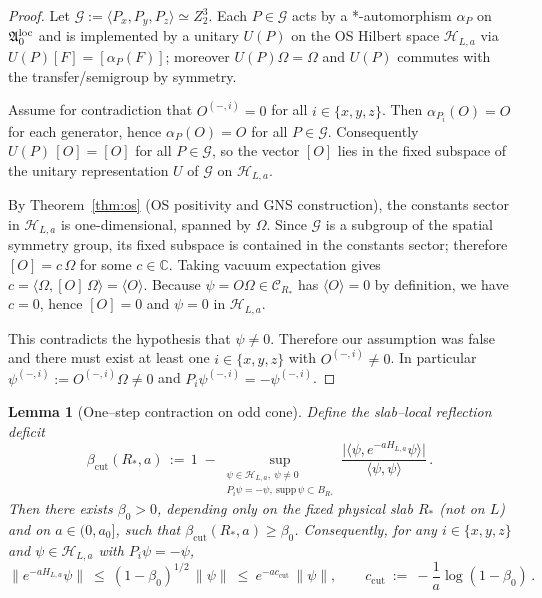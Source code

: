 \documentclass[11pt]{amsart}
\theoremstyle{plain}
\newtheorem{lemma}[theorem]{Lemma}
\theoremstyle{definition}
\theoremstyle{remark}
\begin{document}
\begin{proof}
Let $\mathcal{G}:=\langle P_x,P_y,P_z\rangle\simeq Z_2^3$. Each $P\in\mathcal{G}$ acts by a *-automorphism $\alpha_P$ on $\mathfrak{A}_0^{\rm loc}$ and is implemented by a unitary $U(P)$ on the OS Hilbert space $\mathcal{H}_{L,a}$ via $U(P)[F]=[\alpha_P(F)]$; moreover $U(P)\Omega=\Omega$ and $U(P)$ commutes with the transfer/semigroup by symmetry.

Assume for contradiction that $O^{(-,i)}=0$ for all $i\in\{x,y,z\}$. Then $\alpha_{P_i}(O)=O$ for each generator, hence $\alpha_P(O)=O$ for all $P\in\mathcal{G}$. Consequently $U(P)\,[O]=[O]$ for all $P\in\mathcal{G}$, so the vector $[O]$ lies in the fixed subspace of the unitary representation $U$ of $\mathcal{G}$ on $\mathcal{H}_{L,a}$.

By Theorem~\ref{thm:os} (OS positivity and GNS construction), the constants sector in $\mathcal{H}_{L,a}$ is one-dimensional, spanned by $\Omega$. Since $\mathcal{G}$ is a subgroup of the spatial symmetry group, its fixed subspace is contained in the constants sector; therefore $[O]=c\,\Omega$ for some $c\in\mathbb{C}$. Taking vacuum expectation gives $c=\langle\Omega,[O]\,\Omega\rangle=\langle O\rangle$. Because $\psi=O\Omega\in\mathcal{C}_{R_*}$ has $\langle O\rangle=0$ by definition, we have $c=0$, hence $[O]=0$ and $\psi=0$ in $\mathcal{H}_{L,a}$.

This contradicts the hypothesis that $\psi\ne 0$. Therefore our assumption was false and there must exist at least one $i\in\{x,y,z\}$ with $O^{(-,i)}\ne 0$. In particular $\psi^{(-,i)}:=O^{(-,i)}\Omega\ne 0$ and $P_i\psi^{(-,i)}=-\psi^{(-,i)}$.
\end{proof}

\begin{lemma}[One--step contraction on odd cone]\label{lem:odd-contraction-tp}
Define the slab--local reflection deficit
\[
  \beta_{\mathrm{cut}}(R_*,a)
  \,:=\,
  1\;-
  \sup_{\substack{\psi\in\mathcal H_{L,a},\ \psi\ne 0\\ P_i\psi=-\psi,\ \mathrm{supp}\,\psi\subset B_{R_*}}}
  \frac{\big|\langle\psi, e^{-aH_{L,a}}\psi\rangle\big|}{\langle\psi,\psi\rangle}\,.
\]
Then there exists $\beta_0>0$, depending only on the fixed physical slab $R_*$ (not on $L$) and on $a\in(0,a_0]$, such that $\beta_{\mathrm{cut}}(R_*,a)\ge \beta_0$. Consequently, for any $i\in\{x,y,z\}$ and $\psi\in\mathcal{H}_{L,a}$ with $P_i\psi=-\psi$,
\[
  \|e^{-aH_{L,a}}\psi\|\ \le\ (1-\beta_0)^{1/2}\,\|\psi\|\ \le\ e^{-a c_{\mathrm{cut}}}\,\|\psi\|,
  \qquad c_{\mathrm{cut}}\ :=\ -\frac{1}{a}\log(1-\beta_0)\,.
\]
\end{lemma}
\end{document}
